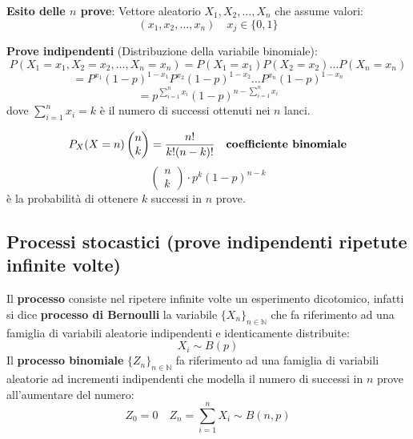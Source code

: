 \documentclass[a4paper]{article}
\theoremstyle{break}
\theoremstyle{break}
\theoremstyle{break}
\theoremstyle{break}
\begin{document}
\vspace{1em}
\noindent \textbf{Esito delle \( n \) prove}: Vettore aleatorio \( X_1, X_2, \ldots, X_n \) che
assume valori:
\[
  (x_1, x_2, \ldots, x_n) \quad x_j \in \{0,1\}
\] 

\vspace{1em}
\noindent \textbf{Prove indipendenti} (Distribuzione della variabile binomiale):
\[
P(X_1 = x_1, X_2 = x_2, \ldots, X_n = x_n) = P(X_1 = x_1)P(X_2 = x_2) \ldots P(X_n = x_n)
\] 
\[
= P^{x_1}(1-p)^{1-x_1}P^{x_2}(1-p)^{1-x_2} \ldots P^{x_n}(1-p)^{1-x_n}
\] 
\[
= p^{\sum_{i=1}^n x_i}(1-p)^{n - \sum_{i=1}^n x_i}
\] 
dove \( \sum_{i=1}^n x_i = k \) è il numero di successi ottenuti nei \( n \) lanci.

\[
P_X(X=n)\begin{pmatrix} n \\ k \end{pmatrix} = \frac{n!}{k!(n-k)!} \quad \text{\textbf{coefficiente
binomiale}}
\] 
\[ \begin{pmatrix} n \\ k \end{pmatrix} \cdot p^k(1-p)^{n-k} \] è la probabilità di ottenere
\( k \) successi in \( n \) prove.

\subsection{Processi stocastici (prove indipendenti ripetute infinite volte)}
Il \textbf{processo} consiste nel ripetere infinite volte un esperimento dicotomico,
infatti si dice \textbf{processo di Bernoulli} la variabile \( \{X_n\}_{n \in \mathbb{N}}
\) che fa riferimento ad una famiglia di variabili aleatorie indipendenti e identicamente
distribuite:
\[
X_i \sim B(p)
\] 
Il \textbf{processo binomiale} \( \{Z_n\}_{n \in \mathbb{N}}  \) fa riferimento ad una
famiglia di variabili aleatorie ad incrementi indipendenti che modella il numero di 
successi in \( n \) prove all'aumentare del numero:
\[
Z_0 = 0 \quad Z_n = \sum_{i=1}^n X_i \sim B(n,p)
\] 
\end{document}
